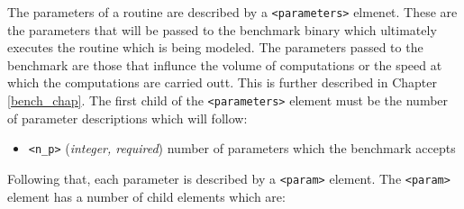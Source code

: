 \documentclass[a4paper,12pt]{report}
\begin{document}
    \noindent The parameters of a routine are described by a 
    \verb+<parameters>+ elmenet. These are the parameters that will be passed to
    the benchmark binary which ultimately executes the routine which is being
    modeled. The parameters passed to the benchmark are those that influnce the
    volume of computations or the speed at which the computations are carried
    outt. This is further described in Chapter \ref{bench_chap}. The first
    child of the \verb+<parameters>+ element must be the number of parameter
    descriptions which will follow:
    \begin{itemize}
        \item \verb+<n_p>+ (\emph{integer, required}) number of parameters
            which the benchmark accepts
    \end{itemize}
    Following that, each parameter is described by a \verb+<param>+ element.
    The \verb+<param>+ element has a number of child elements which are:
\end{document}
